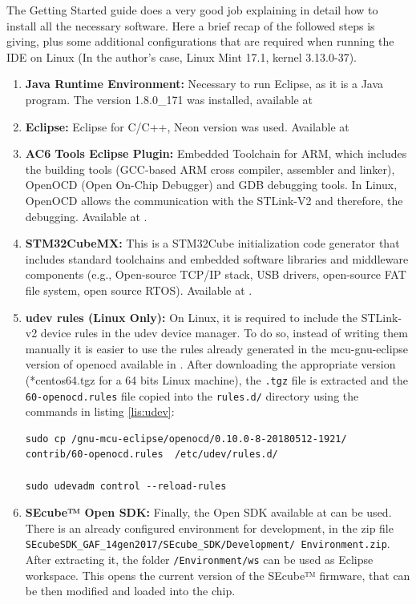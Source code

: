 The Getting Started guide does a very good job explaining in detail how to install all the necessary software. Here a brief recap of the followed steps is giving, plus some additional configurations that are required when running the IDE on Linux (In the author's case, Linux Mint 17.1, kernel 3.13.0-37).


\begin{enumerate}
\setlength\itemsep{0pt}
\item \textbf{Java Runtime Environment:} Necessary to run Eclipse, as it is a Java program. The version 1.8.0\_171 was installed, available at \cite{java}

\item \textbf{Eclipse:} Eclipse for C/C++, Neon version was used. Available at \cite{eclipse}

\item \textbf{AC6 Tools Eclipse Plugin: }  Embedded Toolchain for ARM, which includes the building tools (GCC-based ARM cross compiler, assembler and linker), OpenOCD (Open On-Chip Debugger) and GDB debugging tools. In Linux, OpenOCD allows the communication with the STLink-V2 and therefore, the debugging. Available at \cite{ac6}.

\item \textbf{STM32CubeMX: }This is a STM32Cube initialization code generator that includes standard toolchains and embedded software libraries and middleware components (e.g., Open-source TCP/IP stack, USB drivers, open-source FAT file system, open source RTOS). Available at \cite{cubemx}.

\item \textbf{udev rules (Linux Only): }On Linux, it is required to include the STLink-v2 device rules in the udev device manager. To do so, instead of writing them manually it is easier to use the rules already generated in the mcu-gnu-eclipse version of openocd available in \cite{mcu}. After downloading the appropriate version (*centos64.tgz for a 64 bits Linux machine), the \texttt{.tgz} file is extracted and the \texttt{60-openocd.rules} file copied into the \texttt{rules.d/} directory using the commands in listing \ref{lis:udev}:

\begin{lstlisting}[float=htb, basicstyle=\ttfamily, frame=tb, caption={Including STLink rules to udev manager in Linux}, label = {lis:udev}]
sudo cp /gnu-mcu-eclipse/openocd/0.10.0-8-20180512-1921/
contrib/60-openocd.rules  /etc/udev/rules.d/

sudo udevadm control --reload-rules
\end{lstlisting}


\item \textbf{SEcube™ Open SDK: }Finally, the Open SDK available at \cite{SEcubeRes} can be used. There is an already configured environment for development, in the zip file \texttt{SEcubeSDK\_GAF\_14gen2017/SEcube\_SDK/Development/ Environment.zip}. After extracting it, the folder \texttt{/Environment/ws} can be used as Eclipse workspace. This opens the current version of the SEcube™ firmware, that can be then modified and loaded into the chip.

\end{enumerate}




